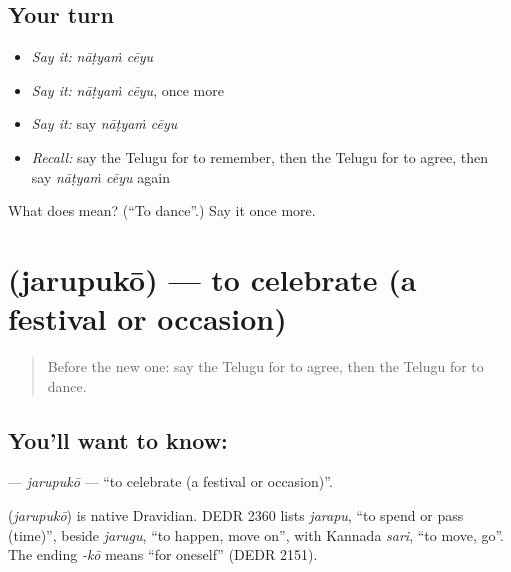 \subsection*{Your turn}
\begin{itemize}
\raggedright
  \item \emph{Say it:} \emph{nāṭyaṁ cēyu}
  \item \emph{Say it:} \emph{nāṭyaṁ cēyu}, once more
  \item \emph{Say it:} say \emph{nāṭyaṁ cēyu}
  \item \emph{Recall:} say the Telugu for to remember, then the Telugu for to agree, then say \emph{nāṭyaṁ cēyu} again
\end{itemize}

\begin{tcolorbox}[breakable,colback=teal!4,colframe=teal!35!black,title={Before you move on}]
What does   mean? (\textquotedblleft{}To dance\textquotedblright{}.) Say it once more.
\end{tcolorbox}
\section[\texorpdfstring{\te{జరుపుకో} (jarupukō)}{జరుపుకో (jarupukō)}]{ (jarupukō) — to celebrate (a festival or occasion)}

\label{lesson:TE-C161-jarupuko}



\begin{quote}
Before the new one: say the Telugu for to agree, then the Telugu for to dance.
\end{quote}

\subsection*{You'll want to know: }
\textbf{} — \emph{jarupukō} — \textquotedblleft{}to celebrate (a festival or occasion)\textquotedblright{}.

\begin{cousinweb}
\textbf{} (\emph{jarupukō}) is native Dravidian. DEDR 2360 lists \emph{jarapu}, \textquotedblleft{}to spend or pass (time)\textquotedblright{}, beside \emph{jarugu}, \textquotedblleft{}to happen, move on\textquotedblright{}, with Kannada \emph{sari}, \textquotedblleft{}to move, go\textquotedblright{}. The ending \emph{-kō} means \textquotedblleft{}for oneself\textquotedblright{} (DEDR 2151).
\end{cousinweb}

